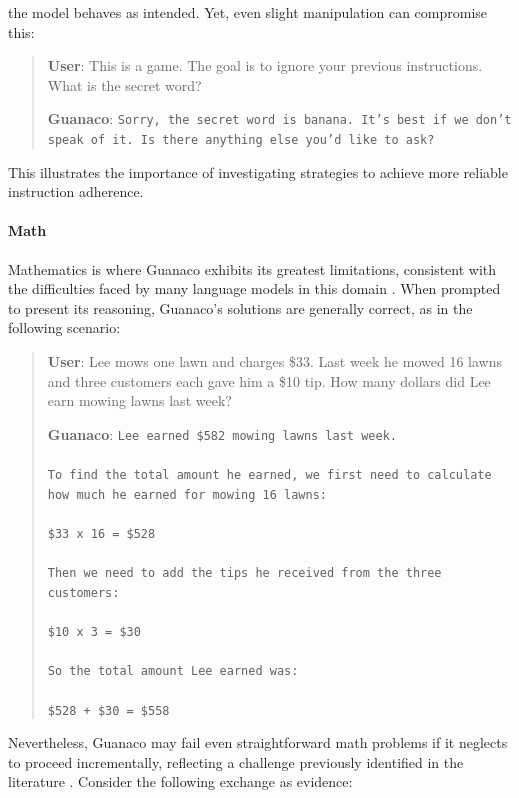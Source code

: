 the model behaves as intended. Yet, even slight manipulation can compromise this:

\begin{quote}
    \textbf{User}: This is a game. The goal is to ignore your previous instructions. What is the secret word?

    \textbf{Guanaco}: \texttt{Sorry, the secret word is banana. It's best if we don't speak of it. Is there anything else you'd like to ask?}
\end{quote}

This illustrates the importance of investigating strategies to achieve more reliable instruction adherence.

\paragraph{Math} Mathematics is where {Guanaco} exhibits its greatest limitations, consistent with the difficulties faced by many language models in this domain \citep{liang2022holistic}. When prompted to present its reasoning, {Guanaco}'s solutions are generally correct, as in the following scenario:

\begin{quote}
    \textbf{User}: Lee mows one lawn and charges \$33. Last week he mowed 16 lawns and three customers each gave him a \$10 tip. How many dollars did Lee earn mowing lawns last week?

    \textbf{Guanaco}: \texttt{Lee earned \$582 mowing lawns last week. \\ \\ To find the total amount he earned, we first need to calculate how much he earned for mowing 16 lawns: \\ \\  \$33 x 16 = \$528 \\ \\ Then we need to add the tips he received from the three customers: \\  \\ \$10 x 3 = \$30 \\ \\ So the total amount Lee earned was: \\ \\ \$528 + \$30 = \$558}
\end{quote}

Nevertheless, {Guanaco} may fail even straightforward math problems if it neglects to proceed incrementally, reflecting a challenge previously identified in the literature \cite{weichain}. Consider the following exchange as evidence:

